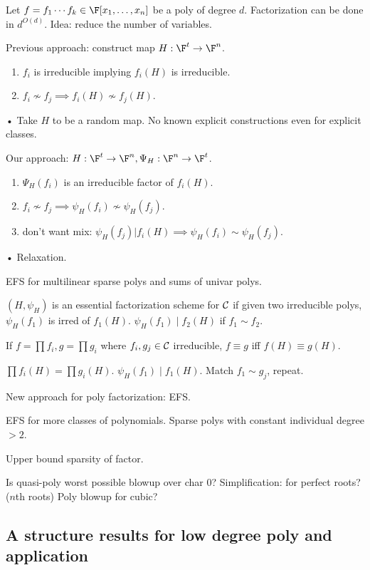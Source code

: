 Let $f=f_1\cdots f_k\in \F[x_1,\ldots, x_n]$ be a poly of degree $d$. Factorization can be done in $d^{O(d)}$.  Idea: reduce the number of variables. 

Previous approach: construct map $H:\F^t\to \F^n$. 
\begin{enumerate}
\item
$f_i$ is irreducible implying $f_i(H)$ is irreducible.
\item
$f_i\nsim f_j\implies f_i(H)\nsim f_j(H)$.
\end{enumerate}•
Take $H$ to be a random map. No known explicit constructions even for explicit classes.

Our approach: $H:\F^t\to \F^n,\Psi_H:\F^n\to \F^t$. 
\begin{enumerate}
\item
$\Psi_H(f_i)$ is an irreducible factor of $f_i(H)$.
\item
$f_i\nsim f_j\implies \psi_H(f_i)\nsim \psi_H(f_j)$.
\item
don't want mix: $\psi_H(f_j)|f_i(H)\implies \psi_H(f_i)\sim \psi_H(f_j)$.
\end{enumerate}•
Relaxation.

EFS for multilinear sparse polys and sums of univar polys.

$(H,\psi_H)$ is an essential factorization scheme for $\cal C$ if given two irreducible polys, $\psi_H(f_1)$ is irred of $f_1(H)$. $\psi_H(f_1)\mid f_2(H)$ if $f_1\sim f_2$.

If $f=\prod f_i,g=\prod g_i$ where $f_i,g_j\in \cal C$ irreducible, $f\equiv g$ iff $f(H)\equiv g(H)$. %

$\prod f_i(H)=\prod g_i(H)$. $\psi_H(f_1)\mid f_1(H)$.
Match $f_1\sim g_j$, repeat.

New approach for poly factorization: EFS.

EFS for more classes of polynomials. Sparse polys with constant individual degree $>2$.

Upper bound sparsity of factor.

Is quasi-poly worst possible blowup over char 0?
Simplification: for perfect roots? ($n$th roots)
Poly blowup for cubic?

\subsection{A structure results for low degree poly and application}

